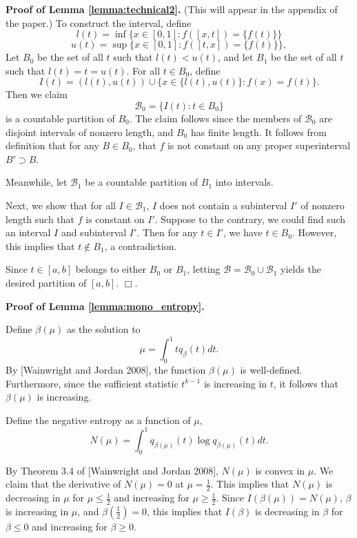 \documentclass[12pt]{article}
\begin{document}
\textbf{Proof of Lemma \ref{lemma:technical2}.} (This will appear in the appendix of the paper.)
To construct the interval, define
\[
l(t) = \inf \{x \in [0,1]: f([x,t]) = \{f(t)\}\}
\]
\[
u(t) = \sup \{x \in [0,1]: f([t,x]) = \{f(t)\}\},
\]
Let $B_0$ be the set of all $t$ such that $l(t) < u(t)$,
and let $B_1$ be the set of all $t$ such that $l(t) = t = u(t)$.
For all $t \in B_0$, define
\[
I(t) = (l(t), u(t)) \cup \{x \in \{l(t), u(t)\}: f(x) = f(t)\}.
\]
Then we claim
\[
\mathcal{B}_0 = \{I(t): t \in B_0\}
\]
is a countable partition of $B_0$.  The claim follows since the
members of $\mathcal{B}_0$ are disjoint intervals of nonzero length,
and $B_0$ has finite length.    It follows from definition that for any $B \in B_0$, that $f$ is not
constant on any proper superinterval $B' \supset B$.

Meanwhile, let $\mathcal{B}_1$ be a countable partition of $B_1$ into
intervals.

Next, we show that for all $I \in \mathcal{B}_1$, $I$ does not contain
a subinterval $I'$ of nonzero length such that $f$ is constant on
$I'$.  Suppose to the contrary, we could find such an interval $I$ and
subinterval $I'$.  Then for any $t \in I'$, we have $t \in B_0$.
However, this implies that $t \notin B_1$, a contradiction.

Since $t \in [a,b]$ belongs to either $B_0$ or $B_1$,
letting $\mathcal{B} = \mathcal{B}_0 \cup \mathcal{B}_1$
yields the desired partition of $[a,b]$. $\Box$.


\textbf{Proof of Lemma \ref{lemma:mono_entropy}.}

Define $\beta(\mu)$ as the solution to
\[
\mu = \int_0^1 t q_\beta(t) dt.
\]
By [Wainwright and Jordan 2008], the function $\beta(\mu)$ is
well-defined.  Furthermore, since the sufficient statistic $t^{k-1}$
is increasing in $t$, it follows that $\beta(\mu)$ is increasing.

Define the negative entropy as a function of $\mu$,
\[
N(\mu) = \int_0^1 q_{\beta(\mu)}(t) \log q_{\beta(\mu)}(t) dt.
\]

By Theorem 3.4 of [Wainwright and Jordan 2008], $N(\mu)$ is convex in
$\mu$.  We claim that the derivative of $N(\mu) = 0$ at $\mu
= \frac{1}{2}$.  This implies that $N(\mu)$ is decreasing in $\mu$ for
$\mu \leq \frac{1}{2}$ and increasing for $\mu \geq \frac{1}{2}$.
Since $I(\beta(\mu)) = N(\mu)$, $\beta$ is increasing in $\mu$, and
$\beta(\frac{1}{2}) = 0$, this implies that $I(\beta)$ is decreasing
in $\beta$ for $\beta \leq 0$ and increasing for $\beta \geq 0$.
\end{document}
